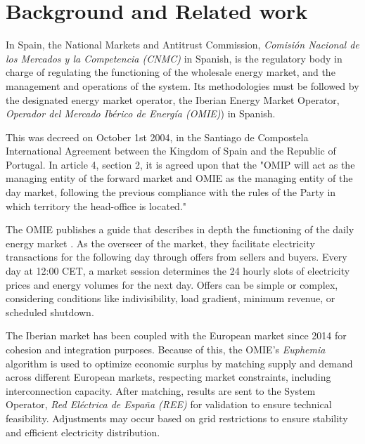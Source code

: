 \documentclass[12pt]{report} %
\begin{document}
\chapter{Background and Related work}
\label{chap:02}
In Spain, the National Markets and Antitrust Commission, \textit{Comisión Nacional de los Mercados y la Competencia (CNMC)} in Spanish, is the regulatory body in charge of regulating the functioning of the wholesale energy market, and the management and operations of the system. \cite{boe_cnmc_BOE-A-2019-17287} Its methodologies must be followed by the designated energy market operator, the Iberian Energy Market Operator, \textit{Operador del Mercado Ibérico de Energía (OMIE)}) in Spanish.

This was decreed on October 1st 2004, in the Santiago de Compostela International Agreement between the Kingdom of Spain and the Republic of Portugal. In article 4, section 2, it is agreed upon that the "OMIP will act as the managing entity of the forward market and OMIE as the managing entity of the day market, following the previous compliance with the rules of the Party in which territory the head-office is located." \cite{SantiagoAgreement2004}


The OMIE publishes a guide that describes in depth the functioning of the daily energy market \cite{OMIE_MercadoDiario}. As the overseer of the market, they facilitate electricity transactions for the following day through offers from sellers and buyers. Every day at 12:00 CET, a market session determines the 24 hourly slots of electricity prices and energy volumes for the next day. Offers can be simple or complex, considering conditions like indivisibility, load gradient, minimum revenue, or scheduled shutdown.

The Iberian market has been coupled with the European market since 2014 for cohesion and integration purposes. Because of this, the OMIE's \textit{Euphemia} algorithm is used to optimize economic surplus by matching supply and demand across different European markets, respecting market constraints, including interconnection capacity. After matching, results are sent to the System Operator, \textit{Red Eléctrica de España (REE)} for validation to ensure technical feasibility. Adjustments may occur based on grid restrictions to ensure stability and efficient electricity distribution.
\end{document}
